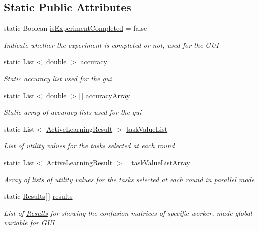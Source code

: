 \subsection*{Static Public Attributes}
\begin{DoxyCompactItemize}
\item 
static Boolean \hyperlink{class_crowdsourcing_models_1_1_active_learning_ac658e48a670fa0f0b7896cf8e2648556}{is\+Experiment\+Completed} = false
\begin{DoxyCompactList}\small\item\em Indicate whether the experiment is completed or not, used for the G\+U\+I \end{DoxyCompactList}\item 
static List$<$ double $>$ \hyperlink{class_crowdsourcing_models_1_1_active_learning_a1ccb8af29304a1b08074ff2bb44b9af6}{accuracy}
\begin{DoxyCompactList}\small\item\em Static accuracy list used for the gui \end{DoxyCompactList}\item 
static List$<$ double $>$\mbox{[}$\,$\mbox{]} \hyperlink{class_crowdsourcing_models_1_1_active_learning_ac95df8d52222fa09da460a1013d303b9}{accuracy\+Array}
\begin{DoxyCompactList}\small\item\em Static array of accuracy lists used for the gui \end{DoxyCompactList}\item 
static List$<$ \hyperlink{class_crowdsourcing_models_1_1_active_learning_result}{Active\+Learning\+Result} $>$ \hyperlink{class_crowdsourcing_models_1_1_active_learning_a83a41d494f96fc2fc9d040ebc6587fcc}{task\+Value\+List}
\begin{DoxyCompactList}\small\item\em List of utility values for the tasks selected at each round \end{DoxyCompactList}\item 
static List$<$ \hyperlink{class_crowdsourcing_models_1_1_active_learning_result}{Active\+Learning\+Result} $>$\mbox{[}$\,$\mbox{]} \hyperlink{class_crowdsourcing_models_1_1_active_learning_a739a1b965a4539eedba478ae2bf0182b}{task\+Value\+List\+Array}
\begin{DoxyCompactList}\small\item\em Array of lists of utility values for the tasks selected at each round in parallel mode \end{DoxyCompactList}\item 
static \hyperlink{class_crowdsourcing_models_1_1_results}{Results}\mbox{[}$\,$\mbox{]} \hyperlink{class_crowdsourcing_models_1_1_active_learning_a4f3abbe012947f48a2476130e2dd9d1e}{results}
\begin{DoxyCompactList}\small\item\em List of \hyperlink{class_crowdsourcing_models_1_1_results}{Results} for showing the confusion matrices of specific worker, made global variable for G\+U\+I \end{DoxyCompactList}\end{DoxyCompactItemize}


